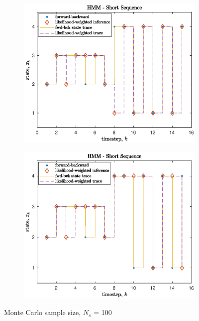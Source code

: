 \documentclass[]{article}
\begin{document}
\begin{figure}[H]
	\begin{subfigure}[b]{0.45\textwidth}
		\begin{center}  
			\includegraphics[scale=0.55]{p2_state_trace_100_1.eps}  
			\caption{}
			\label{}
		\end{center}
	\end{subfigure}
	\hfill
	\begin{subfigure}[b]{0.45\textwidth}
		\begin{center}  
			\includegraphics[scale=0.55]{p2_state_trace_100_2.eps}  
			\caption{}
			\label{}
		\end{center}
	\end{subfigure}
	\caption{Monte Carlo sample size, $N_s$ = 100}
\end{figure}
\end{document}
